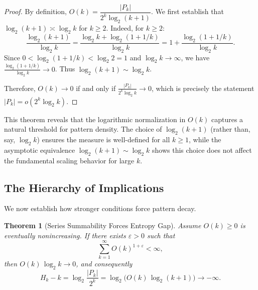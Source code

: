 \documentclass[11pt]{article}
\newtheorem{theorem}{Theorem}
\theoremstyle{definition}
\newcommand{\eps}{\varepsilon}
\begin{document}
\begin{proof}
By definition, $O(k)=\dfrac{|P_k|}{2^k\log_2(k+1)}$. We first establish that $\log_2(k+1)\asymp\log_2 k$ for $k\geq 2$. Indeed, for $k\geq 2$:
$$\frac{\log_2(k+1)}{\log_2 k} = \frac{\log_2 k + \log_2(1 + 1/k)}{\log_2 k} = 1 + \frac{\log_2(1 + 1/k)}{\log_2 k}.$$
Since $0 < \log_2(1 + 1/k) < \log_2 2 = 1$ and $\log_2 k \to \infty$, we have $\frac{\log_2(1 + 1/k)}{\log_2 k} \to 0$. Thus $\log_2(k+1) \sim \log_2 k$.

Therefore, $O(k)\to 0$ if and only if $\frac{|P_k|}{2^k\log_2 k}\to 0$, which is precisely the statement $|P_k|=o(2^k\log_2 k)$.
\end{proof}

This theorem reveals that the logarithmic normalization in $O(k)$ captures a natural threshold for pattern density. The choice of $\log_2(k+1)$ (rather than, say, $\log_2 k$) ensures the measure is well-defined for all $k \geq 1$, while the asymptotic equivalence $\log_2(k+1) \sim \log_2 k$ shows this choice does not affect the fundamental scaling behavior for large $k$.

\subsection{The Hierarchy of Implications}

We now establish how stronger conditions force pattern decay.

\begin{theorem}[Series Summability Forces Entropy Gap]\label{thm:series-to-entropy}
Assume $O(k)\ge 0$ is eventually nonincreasing. If there exists $\eps>0$ such that
\begin{equation}
\sum_{k=1}^{\infty} O(k)^{1+\eps} < \infty,
\end{equation}
then $O(k)\,\log_2 k\to 0$, and consequently
\begin{equation}
H_k-k=\log_2\frac{|P_k|}{2^k}=\log_2\big(O(k)\,\log_2(k+1)\big)\longrightarrow -\infty.
\end{equation}
\end{theorem}
\end{document}
